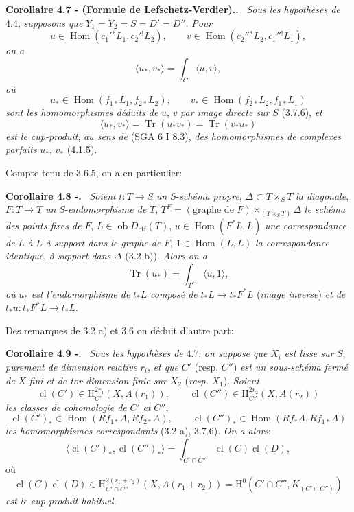 \documentclass[11pt]{article}
\newenvironment{statement}[1]{\par\medskip\noindent\textbf{#1.}\ }{\par\medskip}
\renewcommand{\H}{\mathrm{H}}
\DeclareMathOperator{\Hom}{Hom}
\newcommand{\ob}{\operatorname{ob}}
\providecommand{\Dctf}{D_{\mathrm{ctf}}}
\providecommand{\cl}{\operatorname{cl}}
\providecommand{\Tr}{\operatorname{Tr}}
\providecommand{\Tr}{\operatorname{Tr}}
\providecommand{\Dctf}{D_{\mathrm{ctf}}}
\providecommand{\Tr}{\operatorname{Tr}}
\providecommand{\Hom}{\operatorname{Hom}}
\providecommand{\ob}{\operatorname{ob}}
\providecommand{\Tr}{\operatorname{Tr}}
\providecommand{\cl}{\operatorname{cl}}
\providecommand{\Hom}{\operatorname{Hom}}
\providecommand{\cl}{\operatorname{cl}}
\providecommand{\Tr}{\operatorname{Tr}}
\begin{document}
\begin{statement}{Corollaire 4.7 - (Formule de Lefschetz-Verdier).}
\emph{Sous les hypothèses de} 4.4, \emph{supposons que} $Y_1=Y_2=S=D'=D''$. \emph{Pour}
\[
u\in\Hom(c_1'{}^*L_1,c_2'{}^!L_2),\qquad
v\in\Hom(c_2''{}^*L_2,c_1''{}^!L_1),
\]
\emph{on a}
\begin{equation}
\tag{4.7.1}
\langle u_*,v_*\rangle=\int_C\langle u,v\rangle,
\end{equation}
\emph{où}
\[
u_*\in\Hom(f_{1*}L_1,f_{2*}L_2),\qquad
v_*\in\Hom(f_{2*}L_2,f_{1*}L_1)
\]
\emph{sont les homomorphismes déduits de} $u$, $v$ \emph{par image directe sur} $S$ (3.7.6), \emph{et}
\[
\langle u_*,v_*\rangle=\Tr(u_*v_*)=\Tr(v_*u_*)
\]
\emph{est le cup-produit}, \emph{au sens de} (SGA 6 I 8.3), \emph{des homomorphismes de complexes parfaits} $u_*$, $v_*$ (4.1.5).
\end{statement}

Compte tenu de 3.6.5, on a en particulier:

\begin{statement}{Corollaire 4.8 -}
\emph{Soient} $t:T\longrightarrow S$ \emph{un} $S$-\emph{schéma propre}, $\Delta\subset T\times_S T$ \emph{la diagonale}, $F:T\longrightarrow T$ \emph{un} $S$-\emph{endomorphisme de} $T$, $T^F=(\text{graphe de }F)\times_{(T\times_S T)}\Delta$ \emph{le schéma des points fixes de} $F$, $L\in\ob\Dctf(T)$, $u\in\Hom(F^*L,L)$ \emph{une correspondance de} $L$ \emph{à} $L$ \emph{à support dans le graphe de} $F$, $1\in\Hom(L,L)$ \emph{la correspondance identique}, \emph{à support dans} $\Delta$ (3.2 b)). \emph{Alors on a}
\[
\Tr(u_*)=\int_{T^F}\langle u,1\rangle,
\]
\emph{où} $u_*$ \emph{est l'endomorphisme de} $t_*L$ \emph{composé de} $t_*L\longrightarrow t_*F^*L$ (\emph{image inverse}) \emph{et de} $t_*u:t_*F^*L\longrightarrow t_*L$.
\end{statement}

Des remarques de 3.2 a) et 3.6 on déduit d'autre part:

\begin{statement}{Corollaire 4.9 -}
\emph{Sous les hypothèses de} 4.7, \emph{on suppose que} $X_i$ \emph{est lisse sur} $S$, \emph{purement de dimension relative} $r_i$, \emph{et que} $C'$ (resp. $C''$) \emph{est un sous-schéma}
\emph{fermé de} $X$ \emph{fini et de tor-dimension finie sur} $X_2$ (\emph{resp.} $X_1$). \emph{Soient}
\[
\cl(C')\in \H_{C'}^{2r_1}(X,A(r_1)),\qquad
\cl(C'')\in \H_{C''}^{2r_2}(X,A(r_2))
\]
\emph{les classes de cohomologie de} $C'$ \emph{et} $C''$,
\[
\cl(C')_*\in\Hom(Rf_{1*}A,Rf_{2*}A),\qquad
\cl(C'')_*\in\Hom(Rf_*A,Rf_{1*}A)
\]
\emph{les homomorphismes correspondants} (3.2 a), 3.7.6). \emph{On a alors}:
\[
\langle \cl(C')_*,\cl(C'')_*\rangle
=
\int_{C'\cap C''}\cl(C)\cl(D),
\]
où
\[
\cl(C)\cl(D)\in
\H_{C'\cap C''}^{2(r_1+r_2)}(X,A(r_1+r_2))
=
\H^0(C'\cap C'',K_{(C'\cap C'')})
\]
\emph{est le cup-produit habituel}.
\end{statement}
\end{document}
